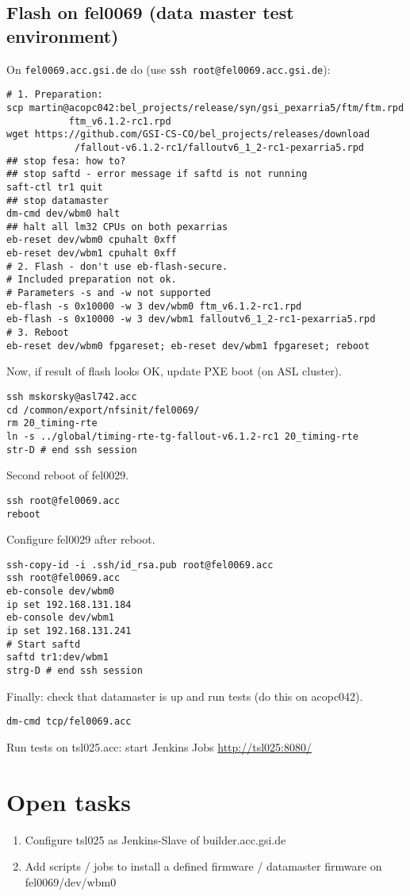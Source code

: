 \documentclass[12pt,a4paper]{report}
\begin{document}
\subsection{Flash on fel0069 (data master test environment)}
On \texttt{fel0069.acc.gsi.de} do (use \texttt{ssh root@fel0069.acc.gsi.de}):
\begin{verbatim}
# 1. Preparation:
scp martin@acopc042:bel_projects/release/syn/gsi_pexarria5/ftm/ftm.rpd
           ftm_v6.1.2-rc1.rpd
wget https://github.com/GSI-CS-CO/bel_projects/releases/download
            /fallout-v6.1.2-rc1/falloutv6_1_2-rc1-pexarria5.rpd
## stop fesa: how to?
## stop saftd - error message if saftd is not running
saft-ctl tr1 quit
## stop datamaster
dm-cmd dev/wbm0 halt
## halt all lm32 CPUs on both pexarrias
eb-reset dev/wbm0 cpuhalt 0xff
eb-reset dev/wbm1 cpuhalt 0xff
# 2. Flash - don't use eb-flash-secure.
# Included preparation not ok.
# Parameters -s and -w not supported
eb-flash -s 0x10000 -w 3 dev/wbm0 ftm_v6.1.2-rc1.rpd
eb-flash -s 0x10000 -w 3 dev/wbm1 falloutv6_1_2-rc1-pexarria5.rpd
# 3. Reboot
eb-reset dev/wbm0 fpgareset; eb-reset dev/wbm1 fpgareset; reboot
\end{verbatim}
Now, if result of flash looks OK, update PXE boot (on ASL cluster).
\begin{verbatim}
ssh mskorsky@asl742.acc
cd /common/export/nfsinit/fel0069/
rm 20_timing-rte
ln -s ../global/timing-rte-tg-fallout-v6.1.2-rc1 20_timing-rte
str-D # end ssh session
\end{verbatim}
Second reboot of fel0029.
\begin{verbatim}
ssh root@fel0069.acc
reboot
\end{verbatim}
Configure fel0029 after reboot.
\begin{verbatim}
ssh-copy-id -i .ssh/id_rsa.pub root@fel0069.acc
ssh root@fel0069.acc
eb-console dev/wbm0
ip set 192.168.131.184
eb-console dev/wbm1
ip set 192.168.131.241
# Start saftd
saftd tr1:dev/wbm1
strg-D # end ssh session
\end{verbatim}
Finally: check that datamaster is up and run tests (do this on acopc042).
\begin{verbatim}
dm-cmd tcp/fel0069.acc
\end{verbatim}
Run tests on tsl025.acc: start Jenkins Jobs \url{http://tsl025:8080/}

\section{Open tasks}
\begin{enumerate}
\item Configure tsl025 as Jenkins-Slave of builder.acc.gsi.de
\item Add scripts / jobs to install a defined firmware / datamaster firmware on fel0069/dev/wbm0
\end{enumerate}
\end{document}
